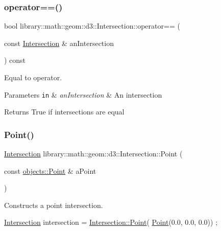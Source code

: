 \subsubsection{\texorpdfstring{operator==()}{operator==()}}
{\footnotesize\ttfamily bool library\+::math\+::geom\+::d3\+::\+Intersection\+::operator== (\begin{DoxyParamCaption}\item[{const \hyperlink{classlibrary_1_1math_1_1geom_1_1d3_1_1_intersection}{Intersection} \&}]{an\+Intersection }\end{DoxyParamCaption}) const}



Equal to operator. 


\begin{DoxyParams}[1]{Parameters}
\mbox{\tt in}  & {\em an\+Intersection} & An intersection \\
\hline
\end{DoxyParams}
\begin{DoxyReturn}{Returns}
True if intersections are equal 
\end{DoxyReturn}
\mbox{\label{classlibrary_1_1math_1_1geom_1_1d3_1_1_intersection_a5155cc245bd2bf96a4296b0a8319c709}} 
\subsubsection{\texorpdfstring{Point()}{Point()}}
{\footnotesize\ttfamily \hyperlink{classlibrary_1_1math_1_1geom_1_1d3_1_1_intersection}{Intersection} library\+::math\+::geom\+::d3\+::\+Intersection\+::\+Point (\begin{DoxyParamCaption}\item[{const \hyperlink{classlibrary_1_1math_1_1geom_1_1d3_1_1objects_1_1_point}{objects\+::\+Point} \&}]{a\+Point }\end{DoxyParamCaption})\hspace{0.3cm}{\ttfamily [static]}}



Constructs a point intersection. 


\begin{DoxyCode}
\hyperlink{classlibrary_1_1math_1_1geom_1_1d3_1_1_intersection_afbaef540a058ccc7e58f1be2585304a9}{Intersection} intersection = \hyperlink{classlibrary_1_1math_1_1geom_1_1d3_1_1_intersection_a5155cc245bd2bf96a4296b0a8319c709}{Intersection::Point}(
      \hyperlink{classlibrary_1_1math_1_1geom_1_1d3_1_1_intersection_a5155cc245bd2bf96a4296b0a8319c709}{Point}(0.0, 0.0, 0.0)) ;
\end{DoxyCode}


